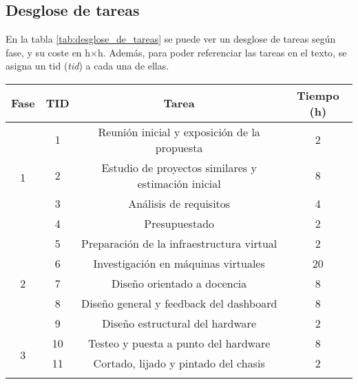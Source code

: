 \subsection{Desglose de tareas}
En la tabla \ref{tab:desglose_de_tareas} se puede ver un desglose de tareas según fase, y su coste en h$\times$h. Además, para poder referenciar las tareas en el texto, se asigna un \acrshort{tid} (\textit{\acrlong{tid}}) a cada una de ellas. 
\begin{table}[h!]
  \centering
  \begin{tabular}{ |c|c|c|c| }
  \hline
  \textbf{Fase} & \textbf{TID} & \textbf{Tarea} & \textbf{Tiempo (h)} \\ 
  \hline
  \multirow{4}{*}{1}        & 1     & {Reunión inicial y exposición de la propuesta}                            & 2 \\\cline{2-4}
                            & 2     & {Estudio de proyectos similares y estimación inicial}                     & 8 \\\cline{2-4}
                            & 3     & {Análisis de requisitos}                                                  & 4 \\\cline{2-4}
                            & 4     & {Presupuestado}                                                           & 2 \\
  \hline
  \multirow{5}{*}{2}        & 5     & {Preparación de la infraestructura virtual}                               & 2 \\\cline{2-4}
                            & 6     & {Investigación en máquinas virtuales}                                     & 20 \\\cline{2-4}
                            & 7     & {Diseño orientado a docencia}                                             & 8 \\\cline{2-4}
                            & 8     & {Diseño general y feedback del dashboard}                                 & 8 \\\cline{2-4}
                            & 9     & {Diseño estructural del hardware}                                         & 2 \\
  \hline
  \multirow{5}{*}{3}        & 10    & {Testeo y puesta a punto del hardware}                                    & 8 \\\cline{2-4}
                            & 11    & {Cortado, lijado y pintado del chasis}                                    & 2 \\\cline{2-4}

\end{tabular}
\end{table}
